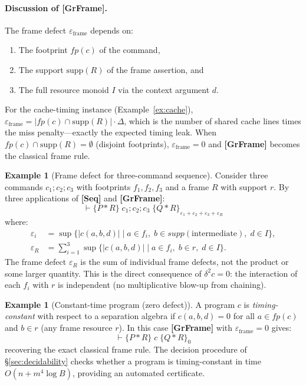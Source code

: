 \documentclass[acmsmall,sigplan,anonymous,review,screen]{acmart}
\theoremstyle{plain}
\theoremstyle{definition}
\newtheorem{example}[theorem]{Example}
\newcommand{\fp}{\mathit{fp}}
\newcommand{\sep}{*}
\newcommand{\defect}{\varepsilon}
\begin{document}
\paragraph{Discussion of [GrFrame].}
The frame defect $\defect_{\mathrm{frame}}$ depends on:
\begin{enumerate}[label=(\roman*),itemsep=2pt]
  \item The footprint $\fp(c)$ of the command,
  \item The support $\mathrm{supp}(R)$ of the frame assertion, and
  \item The full resource monoid $I$ via the context argument $d$.
\end{enumerate}
For the cache-timing instance (Example~\ref{ex:cache}),
$\defect_{\mathrm{frame}} = |\fp(c) \cap \mathrm{supp}(R)| \cdot \Delta$,
which is the number of shared cache lines times the miss penalty---exactly
the expected timing leak.  When $\fp(c) \cap \mathrm{supp}(R) = \emptyset$
(disjoint footprints), $\defect_{\mathrm{frame}} = 0$ and
\textbf{[GrFrame]} becomes the classical frame rule.

\begin{example}[Frame defect for three-command sequence]
\label{ex:frame3}
  Consider three commands $c_1; c_2; c_3$ with footprints $f_1, f_2, f_3$
  and a frame $R$ with support $r$.  By three applications of \textbf{[Seq]}
  and \textbf{[GrFrame]}:
  \[
    \vdash \{P \sep R\}\; c_1;c_2;c_3\; \{Q \sep R\}_{\defect_1 + \defect_2 + \defect_3 + \defect_R}
  \]
  where:
  \begin{align*}
    \defect_i &= \sup\{|c(a, b, d)| \mid a \in f_i,\; b \in \mathit{supp}(\text{intermediate}),\; d \in I\}, \\
    \defect_R &= \sum_{i=1}^3 \sup\{|c(a, b, d)| \mid a \in f_i,\; b \in r,\; d \in I\}.
  \end{align*}
  The frame defect $\defect_R$ is the sum of individual frame defects, not
  the product or some larger quantity.  This is the direct consequence of
  $\delta^2 c = 0$: the interaction of each $f_i$ with $r$ is independent
  (no multiplicative blow-up from chaining).
\end{example}

\begin{example}[Constant-time program (zero defect)]
\label{ex:const-time}
  A program $c$ is \emph{timing-constant} with respect to a separation
  algebra if $c(a, b, d) = 0$ for all $a \in \fp(c)$ and $b \in r$ (any
  frame resource $r$).  In this case \textbf{[GrFrame]} with $\defect_{\mathrm{frame}}=0$
  gives:
  \[
    \vdash \{P \sep R\}\; c\; \{Q \sep R\}_0
  \]
  recovering the exact classical frame rule.  The decision procedure of
  \S\ref{sec:decidability} checks whether a program is timing-constant in
  time $O(n + m^4 \log B)$, providing an automated certificate.
\end{example}
\end{document}
